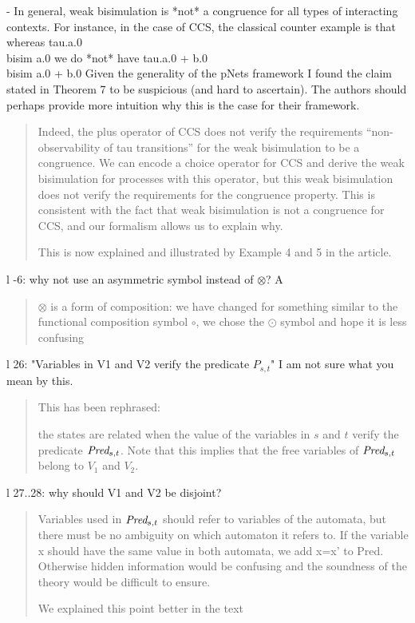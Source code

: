 \documentclass{article}
\begin{document}
- In general, weak bisimulation is *not* a congruence for all types of interacting contexts.  For instance, in the case of CCS, the classical counter example is that whereas 
tau.a.0  \\bisim  a.0
we do *not* have
tau.a.0 + b.0 \\bisim  a.0 + b.0 
Given the generality of the pNets framework I found the claim stated in Theorem 7 to be suspicious (and hard to ascertain).  The authors should perhaps provide more intuition why this is the case for their framework.

\begin{quote}
Indeed, the plus operator of CCS does not verify the requirements ``non-observability of tau transitions'' for the weak bisimulation to be a congruence. 
We can encode a choice operator for CCS and derive the weak bisimulation for processes with this operator, 
but this weak bisimulation does not verify the requirements for the congruence property. This is consistent with the fact that weak bisimulation is not a congruence for CCS, and our formalism allows us to explain why.

This is now explained and illustrated by Example 4 and 5 in the article.
\end{quote}

l -6: why not use an asymmetric symbol instead of $\otimes$? 
A%
\begin{quote}
$\otimes$ is a form of composition: we have changed for something similar to the functional composition symbol $\circ$, we chose the $\odot$ symbol and hope it is less confusing
\end{quote}

l 26: "Variables in V1 and V2 verify the predicate $P_{s,t}$" I am not sure what you mean by this.
\begin{quote}
This has been rephrased:

the states are related when the value of the variables in $s$ and $t$  verify the predicate $\Pred_{s,t}$. Note that this implies that the free variables of  $\Pred_{s,t}$ belong to $V_1$ and $V_2$.

\end{quote}

l 27..28: why should V1 and V2 be disjoint?
\begin{quote}
Variables used in $\Pred_{s,t}$ should refer to variables of the automata, but there must be no ambiguity on which automaton it refers to. If the variable x should have the same value in both automata, we add x=x' to Pred. Otherwise hidden information would be confusing and the soundness of the theory would be difficult to ensure.

We explained this point better in the text
\end{quote}
\end{document}
